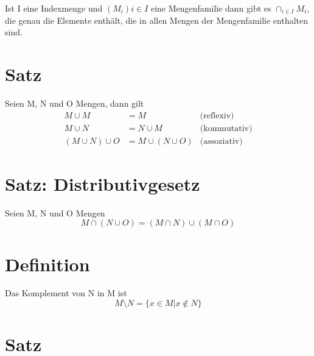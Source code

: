 \documentclass{article}
\begin{document}
Ist I eine Indexmenge und $(M_i){i \in I}$ eine Mengenfamilie dann gibt es $\cap_{i \in I}M_i$, die genau die Elemente enthält,
die in allen Mengen der Mengenfamilie enthalten sind.

\section{Satz}

Seien M, N und O Mengen, dann gilt
\begin{align}
 M \cup M & = M & \text{(reflexiv)}\\
 M \cup N & = N \cup M & \text{(kommutativ)}\\
 (M \cup N) \cup O & = M \cup (N \cup O) & \text{(assoziativ)}
\end{align}

\section{Satz: Distributivgesetz}

Seien M, N und O Mengen
\begin{equation}
 M \cap (N \cup O) = (M \cap N) \cup (M \cap O)
\end{equation}

\section{Definition}

Das Komplement von N in M ist 
\begin{equation}
 M \setminus N = \{ x \in M | x \notin N \}
\end{equation}

\section{Satz}
\end{document}
